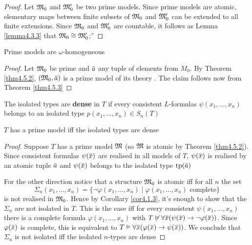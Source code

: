 \documentclass[11pt]{article}
\begin{document}
\begin{proof}
Let \(\mathfrak{M}_0\) and \(\mathfrak{M}_0'\) be two prime models. Since prime models are atomic, elementary maps
between finite subsets of \(\mathfrak{M}_0\) and \(\mathfrak{M}_0'\) can be extended to all finite extensions.
Since \(\mathfrak{M}_0\) and \(\mathfrak{M}_0'\) are countable, it follows as Lemma \ref{lemma4.3.3} that \(\mathfrak{M}_0\cong\mathfrak{M}_0'\);''
\end{proof}

\begin{corollary}[]
Prime models are \(\omega\)-homogeneous
\end{corollary}

\begin{proof}
Let \(\mathfrak{M}_0\) be prime and \(\bara\) any tuple of elements from \(M_0\). By Theorem
\ref{thm4.5.2}, \((\fM_0,\bara)\) is a prime model of its theory
. The claim follows now from Theorem \ref{thm4.5.3}
\end{proof}


\begin{definition}[]
The isolated types are \textbf{dense} in \(T\) if every consistent \(L\)-formulas \(\psi(x_1,\dots,x_n)\) belongs
to an isolated type \(p(x_1,\dots,x_n)\in S_n(T)\)
\end{definition}

\begin{theorem}[]
\(T\) has a prime model iff the isolated types are dense
\end{theorem}

\begin{proof}
Suppose \(T\) has a prime model \(\mathfrak{M}\) (so \(\mathfrak{M}\) is atomic by Theorem \ref{thm4.5.2}). Since
consistent formulas \(\psi(\barx)\) are realised in all models of \(T\), \(\psi(\barx)\) is realised
by an atomic tuple \(\bara\) and \(\psi(\barx)\) belongs to the isolated type \(\tp(\bara)\)

For the other direction notice that a structure \(\mathfrak{M}_0\) is atomic iff for all \(n\) the set
\begin{equation*}
\Sigma_n(x_1,\dots,x_n)=\{\neg\varphi(x_1,\dots,x_n)\mid\varphi(x_1,\dots,x_n)\text{ complete}\}
\end{equation*}
is not realised in \(\mathfrak{M}_0\).
Hence by Corollary \ref{cor4.1.3}, it's enough to show that the \(\Sigma_n\) are not isolated in \(T\).
This is the case iff for every consistent \(\psi(x_1,\dots,x_n)\) there is a complete
formula \(\varphi(x_1,\dots,x_n)\) with \(T\not\vDash\forall\barx(\psi(\barx)\to\neg\varphi(\barx))\).
Since \(\varphi(\barx)\) is
complete, this is equivalent to \(T\vDash\forall\barx(\varphi(\barx)\to\psi(\barx))\). We conclude that \(\Sigma_n\) is not
isolated iff the isolated \(n\)-types are dense
\end{proof}
\end{document}
